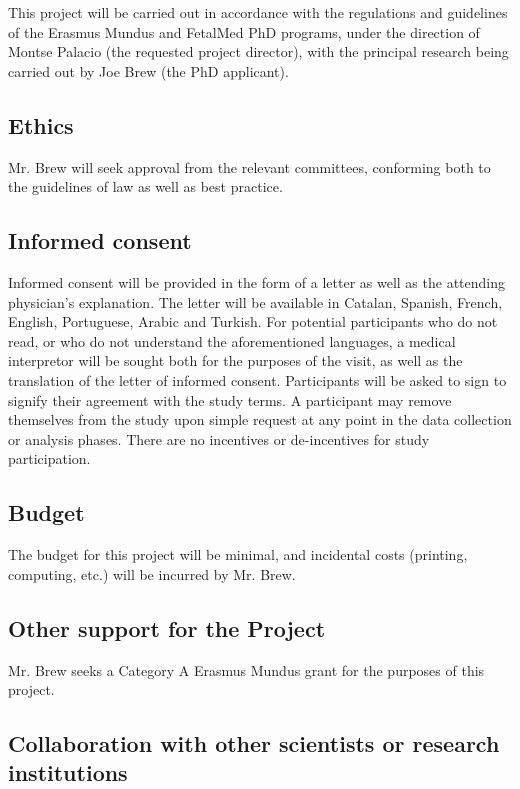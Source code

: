 \documentclass{article}
\begin{document}
\begin{multicols}{2}
This project will be carried out in accordance with the regulations and guidelines of the Erasmus Mundus and FetalMed PhD programs, under the direction of Montse Palacio (the requested project director), with the principal research being carried out by Joe Brew (the PhD applicant). 

\subsection*{Ethics}

Mr. Brew will seek approval from the relevant committees, conforming both to the guidelines of law as well as best practice.


\subsection*{Informed consent}
Informed consent will be provided in the form of a letter as well as the attending physician's explanation.  The letter will be available in Catalan, Spanish, French, English, Portuguese, Arabic and Turkish.  For potential participants who do not read, or who do not understand the aforementioned languages, a medical interpretor will be sought both for the purposes of the visit, as well as the translation of the letter of informed consent.  Participants will be asked to sign to signify their agreement with the study terms.  A participant may remove themselves from the study upon simple request at any point in the data collection or analysis phases.  There are no incentives or de-incentives for study participation.  


\subsection*{Budget}

The budget for this project will be minimal, and incidental costs (printing, computing, etc.) will be incurred by Mr. Brew.  

\subsection*{Other support for the Project}

Mr. Brew seeks a Category A Erasmus Mundus grant for the purposes of this project.

\subsection*{Collaboration with other scientists or research institutions}


\end{multicols}
\end{document}
